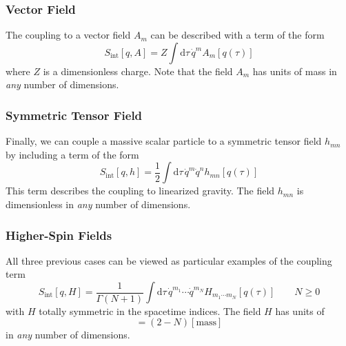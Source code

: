 \subsubsection{Vector Field}
The coupling to a vector field $A_{m}$ can be described with a term of the form
\begin{equation}
	S_{\text{int}}[q, A] = Z \int \mathrm{d}\tau \, \dot{q}^{m} A_{m}[q(\tau)] \label{CouplingA}
\end{equation}
where $Z$ is a dimensionless charge. Note that the field $A_{m}$ has units of mass in \textit{any} number of dimensions.
\subsubsection{Symmetric Tensor Field}
Finally, we can couple a massive scalar particle to a symmetric tensor field $h_{mn}$ by including a term of the form
\begin{equation}
	S_{\text{int}}[q, h] = \frac{1}{2} \int \mathrm{d}\tau \, \dot{q}^{m} \dot{q}^{n} h_{mn}[q(\tau)] \label{Couplingh}
\end{equation}
This term describes the coupling to linearized gravity. The field $h_{mn}$ is dimensionless in \textit{any} number of dimensions.
\subsubsection{Higher-Spin Fields}
All three previous cases can be viewed as particular examples of the coupling term
\begin{equation}
	S_{\text{int}}[q, H] = \frac{1}{\Gamma(N + 1)} \int \mathrm{d}\tau \, \dot{q}^{m_{1}} \cdots \dot{q}^{m_{N}} H_{m_{1} \cdots m_{N}}[q(\tau)] \qquad N \geq 0 \label{HigherSpinCoupling}
\end{equation}
with $H$ totally symmetric in the spacetime indices. The field $H$ has units of
\begin{equation}
	[H] =  (2 - N) [\text{mass}]
\end{equation}
in \textit{any} number of dimensions.

